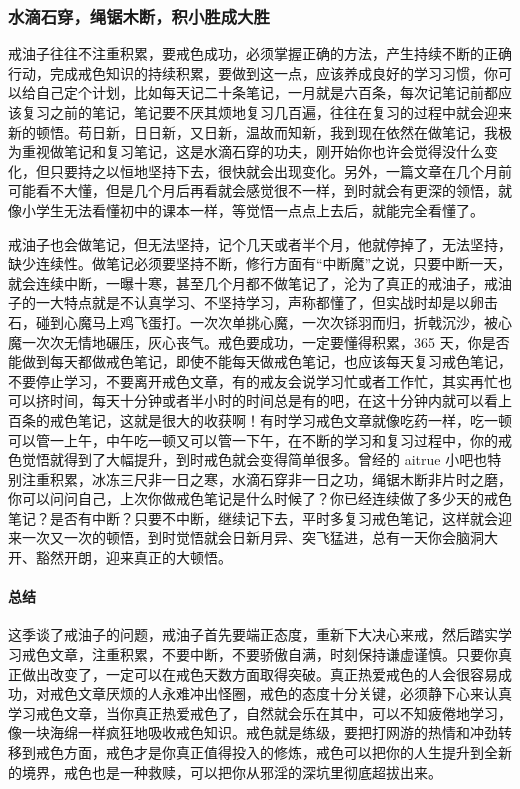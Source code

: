 \subsubsection{水滴石穿，绳锯木断，积小胜成大胜}

戒油子往往不注重积累，要戒色成功，必须掌握正确的方法，产生持续不断的正确行动，完成戒色知识的持续积累，要做到这一点，应该养成良好的学习习惯，你可以给自己定个计划，比如每天记二十条笔记，一月就是六百条，每次记笔记前都应该复习之前的笔记，笔记要不厌其烦地复习几百遍，往往在复习的过程中就会迎来新的顿悟。苟日新，日日新，又日新，温故而知新，我到现在依然在做笔记，我极为重视做笔记和复习笔记，这是水滴石穿的功夫，刚开始你也许会觉得没什么变化，但只要持之以恒地坚持下去，很快就会出现变化。另外，一篇文章在几个月前可能看不大懂，但是几个月后再看就会感觉很不一样，到时就会有更深的领悟，就像小学生无法看懂初中的课本一样，等觉悟一点点上去后，就能完全看懂了。

戒油子也会做笔记，但无法坚持，记个几天或者半个月，他就停掉了，无法坚持，缺少连续性。做笔记必须要坚持不断，修行方面有“中断魔”之说，只要中断一天，就会连续中断，一曝十寒，甚至几个月都不做笔记了，沦为了真正的戒油子，戒油子的一大特点就是不认真学习、不坚持学习，声称都懂了，但实战时却是以卵击石，碰到心魔马上鸡飞蛋打。一次次单挑心魔，一次次铩羽而归，折戟沉沙，被心魔一次次无情地碾压，灰心丧气。戒色要成功，一定要懂得积累，365 天，你是否能做到每天都做戒色笔记，即使不能每天做戒色笔记，也应该每天复习戒色笔记，不要停止学习，不要离开戒色文章，有的戒友会说学习忙或者工作忙，其实再忙也可以挤时间，每天十分钟或者半小时的时间总是有的吧，在这十分钟内就可以看上百条的戒色笔记，这就是很大的收获啊！有时学习戒色文章就像吃药一样，吃一顿可以管一上午，中午吃一顿又可以管一下午，在不断的学习和复习过程中，你的戒色觉悟就得到了大幅提升，到时戒色就会变得简单很多。曾经的 aitrue 小吧也特别注重积累，冰冻三尺非一日之寒，水滴石穿非一日之功，绳锯木断非片时之磨，你可以问问自己，上次你做戒色笔记是什么时候了？你已经连续做了多少天的戒色笔记？是否有中断？只要不中断，继续记下去，平时多复习戒色笔记，这样就会迎来一次又一次的顿悟，到时觉悟就会日新月异、突飞猛进，总有一天你会脑洞大开、豁然开朗，迎来真正的大顿悟。

\paragraph*{总结}

这季谈了戒油子的问题，戒油子首先要端正态度，重新下大决心来戒，然后踏实学习戒色文章，注重积累，不要中断，不要骄傲自满，时刻保持谦虚谨慎。只要你真正做出改变了，一定可以在戒色天数方面取得突破。真正热爱戒色的人会很容易成功，对戒色文章厌烦的人永难冲出怪圈，戒色的态度十分关键，必须静下心来认真学习戒色文章，当你真正热爱戒色了，自然就会乐在其中，可以不知疲倦地学习，像一块海绵一样疯狂地吸收戒色知识。戒色就是练级，要把打网游的热情和冲劲转移到戒色方面，戒色才是你真正值得投入的修炼，戒色可以把你的人生提升到全新的境界，戒色也是一种救赎，可以把你从邪淫的深坑里彻底超拔出来。

